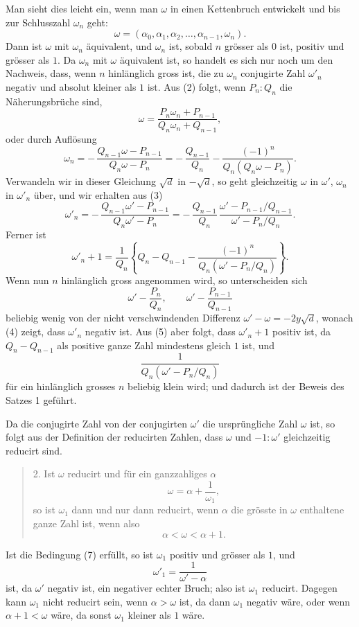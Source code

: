\documentclass[11pt]{article}
\begin{document}
Man sieht dies leicht ein, wenn man $\omega$ in einen Kettenbruch entwickelt und bis zur Schlusszahl $\omega_n$ geht:
\[
\tag{2}        \omega=(\alpha_0,\alpha_1,\alpha_2,\ldots,\alpha_{n-1},\omega_n).
\]
Dann ist $\omega$ mit $\omega_n$ äquivalent, und $\omega_n$ ist, sobald $n$ grösser als $0$ ist, positiv und grösser als $1$. Da $\omega_n$ mit $\omega$ äquivalent ist, so handelt es sich nur noch um den Nachweis, dass, wenn $n$ hinlänglich gross ist, die zu $\omega_n$ conjugirte Zahl $\omega'_n$ negativ und absolut kleiner als $1$ ist. Aus (2) folgt, wenn $P_n:Q_n$ die Näherungsbrüche sind,
\[
        \omega=\frac{P_n\omega_n+P_{n-1}}{Q_n\omega_n+Q_{n-1}},
\]
oder durch Auflösung
\[
\tag{3}        \omega_n
=-\,\frac{Q_{n-1}\omega-P_{n-1}}{Q_n\omega-P_n}
=-\,\frac{Q_{n-1}}{Q_n}
-\frac{(-1)^n}{Q_n(Q_n\omega-P_n)}.
\]
Verwandeln wir in dieser Gleichung $\sqrt d$ in $-\sqrt d$, so geht gleichzeitig $\omega$ in $\omega'$, $\omega_n$ in $\omega'_n$ über, und wir erhalten aus (3)
\[
\tag{4}        \omega'_n
=-\,\frac{Q_{n-1}\omega'-P_{n-1}}{Q_n\omega'-P_n}
=-\,\frac{Q_{n-1}}{Q_n}\,
\frac{\omega'-P_{n-1}/Q_{n-1}}{\omega'-P_n/Q_n}.
\]
Ferner ist
\[
\tag{5}        \omega'_n+1=
\frac1{Q_n}\left\{Q_n-Q_{n-1}
-\frac{(-1)^n}{Q_n\left(\omega'-P_n/Q_n\right)}\right\}.
\]
Wenn nun $n$ hinlänglich gross angenommen wird, so unterscheiden sich
\[
        \omega'-\frac{P_n}{Q_n},\qquad
        \omega'-\frac{P_{n-1}}{Q_{n-1}}
\]
beliebig wenig von der nicht verschwindenden Differenz $\omega'-\omega=-2y\sqrt d$, wonach (4) zeigt, dass $\omega'_n$ negativ ist. Aus (5) aber folgt, dass $\omega'_n+1$ positiv ist, da $Q_n-Q_{n-1}$ als positive ganze Zahl mindestens gleich $1$ ist, und
\[
        \frac1{Q_n(\omega'-P_n/Q_n)}
\]
für ein hinlänglich grosses $n$ beliebig klein wird; und dadurch ist der Beweis des Satzes 1 geführt.

Da die conjugirte Zahl von der conjugirten $\omega'$ die ursprüngliche Zahl $\omega$ ist, so folgt aus der Definition der reducirten Zahlen, dass $\omega$ und $-1:\omega'$ gleichzeitig reducirt sind.

\begin{quote}
2. Ist $\omega$ reducirt und für ein ganzzahliges $\alpha$
\[
\tag{6}        \omega=\alpha+\frac1{\omega_1},
\]
so ist $\omega_1$ dann und nur dann reducirt, wenn $\alpha$ die grösste in $\omega$ enthaltene ganze Zahl ist, wenn also
\[
\tag{7}        \alpha<\omega<\alpha+1.
\]
\end{quote}

Ist die Bedingung (7) erfüllt, so ist $\omega_1$ positiv und grösser als $1$, und
\[
\tag{8}        \omega'_1=\frac1{\omega'-\alpha}
\]
ist, da $\omega'$ negativ ist, ein negativer echter Bruch; also ist $\omega_1$ reducirt. Dagegen kann $\omega_1$ nicht reducirt sein, wenn $\alpha>\omega$ ist, da dann $\omega_1$ negativ wäre, oder wenn $\alpha+1<\omega$ wäre, da sonst $\omega_1$ kleiner als $1$ wäre.
\end{document}
